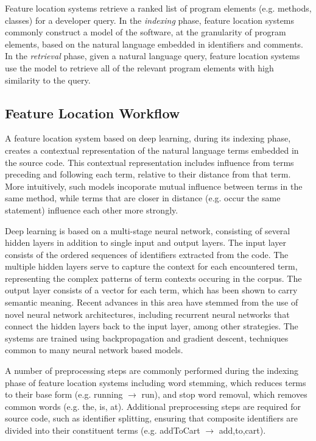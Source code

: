 
%      
%

Feature location systems retrieve a ranked list of program elements
(e.g. methods, classes) for a developer query. In the {\em indexing}
phase, feature location systems commonly construct a model of the
software, at the granularity of program elements, based on the natural
language embedded in identifiers and comments. In the {\em retrieval}
phase, given a natural language query, feature location systems use
the model to retrieve all of the relevant program elements with high
similarity to the query.

\subsection{Feature Location Workflow}

A feature location system based on deep learning, during its indexing
phase, creates a contextual representation of the natural language
terms embedded in the source code. This contextual representation
includes influence from terms preceding and following each term,
relative to their distance from that term. More intuitively, such
models incoporate mutual influence between terms in the same method,
while terms that are closer in distance (e.g. occur the same
statement) influence each other more strongly. 


Deep learning is based on a multi-stage neural network, consisting of
several hidden layers in addition to single input and output layers.
The input layer consists of the ordered sequences of identifiers
extracted from the code. The multiple hidden layers serve to capture
the context for each encountered term, representing the complex
patterns of term contexts occuring in the corpus. The output layer
consists of a vector for each term, which has been shown to carry
semantic meaning. Recent advances in this area have stemmed from the
use of novel neural network architectures, including recurrent neural
networks that connect the hidden layers back to the input layer, among
other strategies. The systems are trained using backpropagation and
gradient descent, techniques common to many neural network based
models.

 
A number of preprocessing steps are commonly performed during the
indexing phase of feature location systems including word stemming,
which reduces terms to their base form (e.g. running $\rightarrow$
run), and stop word removal, which removes common words (e.g. the, is,
at). Additional preprocessing steps are required for source code, such
as identifier splitting, ensuring that composite identifiers are
divided into their constituent terms (e.g. addToCart $\rightarrow$
add,to,cart). 


